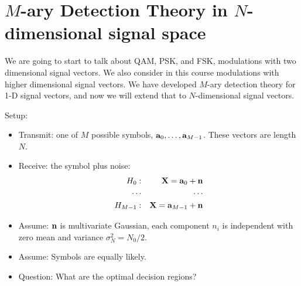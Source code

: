 


\section{$M$-ary Detection Theory in $N$-dimensional signal space}

We are going to start to talk about QAM, PSK, and FSK, modulations with two dimensional signal vectors. We also consider in this course modulations with higher dimensional signal vectors.  We have developed $M$-ary detection theory for 1-D signal vectors, and now we will extend that to $N$-dimensional signal vectors.

Setup:
\begin{itemize}
 \item Transmit: one of $M$ possible symbols, $\mathbf{a}_0, \ldots, \mathbf{a}_{M-1}$.  These vectors are length $N$.
 \item Receive: the symbol plus noise:
\begin{eqnarray}
  H_0: && \mathbf{X} = \mathbf{a}_0 + \mathbf{n} \nonumber \\
  \cdots && \cdots \nonumber \\
  H_{M-1}: && \mathbf{X} = \mathbf{a}_{M-1} + \mathbf{n} \nonumber
\end{eqnarray}
 \item Assume: $\mathbf{n}$ is multivariate Gaussian, each component $n_i$ is independent with zero mean and variance $\sigma_N^2 = N_0/2$.
 \item Assume: Symbols are equally likely.
 \item Question: What are the optimal decision regions?
\end{itemize}

